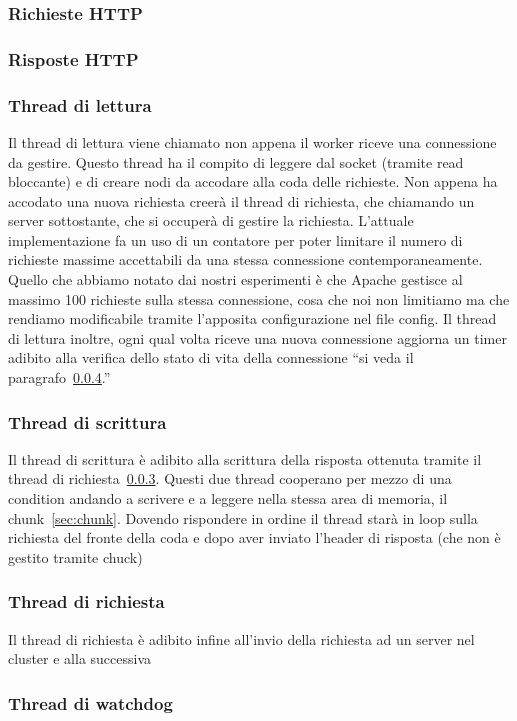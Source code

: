 \documentclass[italian]{tktltiki2}
\begin{document}
\subsubsection*{Richieste HTTP}
\subsubsection*{Risposte HTTP}
\subsubsection{Thread di lettura}
\label{sec:reader}
Il thread di lettura viene chiamato non appena il worker riceve una connessione da gestire. Questo thread ha il compito di leggere dal socket (tramite read bloccante) e di creare nodi da accodare alla coda delle richieste. Non appena ha accodato una nuova richiesta creerà il thread di richiesta, che chiamando un server sottostante, che si occuperà di gestire la richiesta. L'attuale implementazione fa un uso di un contatore per poter limitare il numero di richieste massime accettabili da una stessa connessione contemporaneamente. Quello che abbiamo notato dai nostri esperimenti è che Apache gestisce al massimo 100 richieste sulla stessa connessione, cosa che noi non limitiamo ma che rendiamo modificabile tramite l'apposita configurazione nel file config.
Il thread di lettura inoltre, ogni qual volta riceve una nuova connessione aggiorna un timer adibito alla verifica dello stato di vita della connessione ``si veda il paragrafo~\ref{sec:watchdog}.''
\subsubsection{Thread di scrittura}
\label{sec:writer}
Il thread di scrittura è adibito alla scrittura della risposta ottenuta tramite il thread di richiesta~\ref{sec:request}. Questi due thread cooperano per mezzo di una condition andando a scrivere e a leggere nella stessa area di memoria, il chunk~\ref{sec:chunk}. Dovendo rispondere in ordine il thread starà in loop sulla richiesta del fronte della coda e dopo aver inviato l'header di risposta (che non è gestito tramite chuck) 
\subsubsection{Thread di richiesta}
\label{sec:request}
Il thread di richiesta è adibito infine all'invio della richiesta ad un server nel cluster e alla successiva 
\subsubsection{Thread di watchdog}
\label{sec:watchdog}
\end{document}
